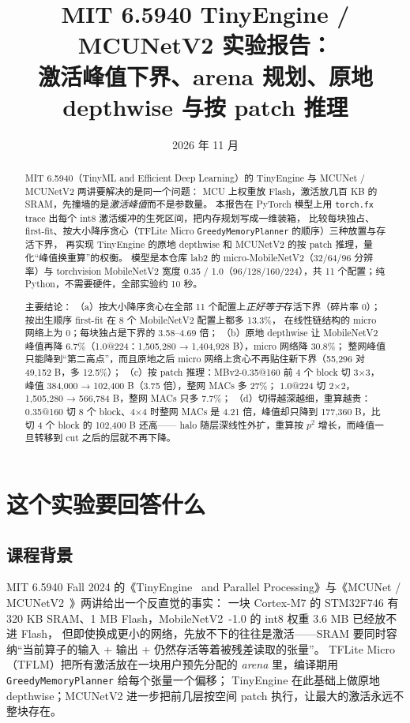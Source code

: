 \documentclass[11pt,a4paper]{ctexart}
\title{MIT 6.5940 TinyEngine / MCUNetV2 实验报告：\\激活峰值下界、arena 规划、原地 depthwise 与按 patch 推理}
\author{\authorline}
\date{2026 年 11 月}
\begin{document}
\maketitle

\begin{abstract}
MIT 6.5940（TinyML and Efficient Deep Learning）的 TinyEngine 与 MCUNet / MCUNetV2 两讲要解决的是同一个问题：
MCU 上权重放 Flash，激活放几百 KB 的 SRAM，先撞墙的是\emph{激活峰值}而不是参数量。
本报告在 PyTorch 模型上用 \texttt{torch.fx} trace 出每个 int8 激活缓冲的生死区间，把内存规划写成一维装箱，
比较每块独占、first-fit、按大小降序贪心（TFLite Micro \texttt{GreedyMemoryPlanner} 的顺序）三种放置与存活下界，
再实现 TinyEngine 的原地 depthwise 和 MCUNetV2 的按 patch 推理，量化“峰值换重算”的权衡。
模型是本仓库 lab2 的 micro-MobileNetV2（32/64/96 分辨率）与 torchvision MobileNetV2 宽度 0.35 / 1.0（96/128/160/224），共 11 个配置；纯 Python，不需要硬件，全部实验约 10 秒。

主要结论：
（a）按大小降序贪心在全部 11 个配置上\emph{正好等于}存活下界（碎片率 0）；按出生顺序 first-fit 在 8 个 MobileNetV2 配置上都多 13.3\%，
    在线性链结构的 micro 网络上为 0；每块独占是下界的 3.58--4.69 倍；
（b）原地 depthwise 让 MobileNetV2 峰值再降 6.7\%（1.0@224：1,505,280 → 1,404,928 B），micro 网络降 30.8\%；
    整网峰值只能降到“第二高点”，而且原地之后 micro 网络上贪心不再贴住新下界（55,296 对 49,152 B，多 12.5\%）；
（c）按 patch 推理：MBv2-0.35@160 前 4 个 block 切 3×3，峰值 384,000 → 102,400 B（3.75 倍），整网 MACs 多 27\%；
    1.0@224 切 2×2，1,505,280 → 566,784 B，整网 MACs 只多 7.7\%；
（d）切得越深越细，重算越贵：0.35@160 切 8 个 block、4×4 时整网 MACs 是 4.21 倍，峰值却只降到 177,360 B，比切 4 个 block 的 102,400 B 还高——
    halo 随层深线性外扩，重算按 $p^2$ 增长，而峰值一旦转移到 cut 之后的层就不再下降。
\end{abstract}

\tableofcontents
\newpage

\section{这个实验要回答什么}

\subsection{课程背景}
MIT 6.5940 Fall 2024 的《TinyEngine~\cite{mcunet} and Parallel Processing》与《MCUNet / MCUNetV2~\cite{mcunetv2}》两讲给出一个反直觉的事实：
一块 Cortex-M7 的 STM32F746 有 320 KB SRAM、1 MB Flash，MobileNetV2~\cite{mobilenetv2}-1.0 的 int8 权重 3.6 MB 已经放不进 Flash，
但即使换成更小的网络，先放不下的往往是激活——SRAM 要同时容纳“当前算子的输入 + 输出 + 仍然存活等着被残差读取的张量”。
TFLite Micro（TFLM）把所有激活放在一块用户预先分配的 \emph{arena} 里，编译期用 \texttt{GreedyMemoryPlanner} 给每个张量一个偏移；
TinyEngine 在此基础上做原地 depthwise；MCUNetV2 进一步把前几层按空间 patch 执行，让最大的激活永远不整块存在。
\end{document}
